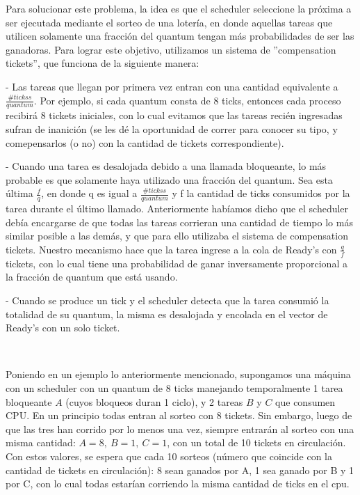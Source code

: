 Para solucionar este problema, la idea es que el scheduler seleccione la próxima a ser ejecutada mediante el sorteo de una lotería, en donde aquellas tareas que utilicen solamente una fracción del quantum
tengan más probabilidades de ser las ganadoras. Para lograr este objetivo, utilizamos un sistema de ''compensation tickets'', que funciona de la siguiente manera:

- Las tareas que llegan por primera vez entran con una cantidad equivalente a $\frac{\#tickss}{quantum}$. Por ejemplo, si cada quantum consta de 8 ticks, entonces cada
proceso recibirá 8 tickets iniciales, con lo cual evitamos que las tareas recién ingresadas sufran de inanición (se les dé la oportunidad de correr para conocer su tipo, 
y comepensarlos (o no) con la cantidad de tickets correspondiente).

- Cuando una tarea es desalojada debido a una llamada bloqueante, lo más probable es que solamente haya utilizado una fracción del quantum. Sea esta última $\frac{f}{q}$,
en donde q es igual a $\frac{\#tickss}{quantum}$ y f la cantidad de ticks consumidos por la tarea durante el último llamado.
Anteriormente habíamos dicho que el scheduler debía encargarse de que todas las tareas corrieran una cantidad de tiempo lo más similar posible a las demás, y que para ello utilizaba
el sistema de compensation tickets. Nuestro mecanismo hace que la tarea ingrese a la cola de Ready's con $\frac{q}{f}$ tickets, con lo cual tiene una probabilidad de ganar
inversamente proporcional a la fracción de quantum que está usando.

- Cuando se produce un tick y el scheduler detecta que la tarea consumió la totalidad de su quantum, la misma es desalojada y encolada en el vector de Ready's con un solo ticket.

~


Poniendo en un ejemplo lo anteriormente mencionado, supongamos una máquina con un scheduler con
un quantum de 8 ticks manejando temporalmente 
1 tarea bloqueante $A$ (cuyos bloqueos duran 1 ciclo), y 2 tareas $B$ y $C$ que consumen CPU. En un principio todas entran al sorteo con 8
tickets. Sin embargo, luego de que las tres han corrido por lo menos una vez, siempre entrarán al sorteo con una misma cantidad: $A=8, \ B=1, \ C=1$, con un total de
10 tickets en circulación. Con estos valores, se espera que cada 10 sorteos (número que coincide con la cantidad de tickets en circulación): 8 sean ganados por A,
1 sea ganado por B y 1 por C, con lo cual todas estarían corriendo la misma cantidad de ticks en el cpu. 




 
